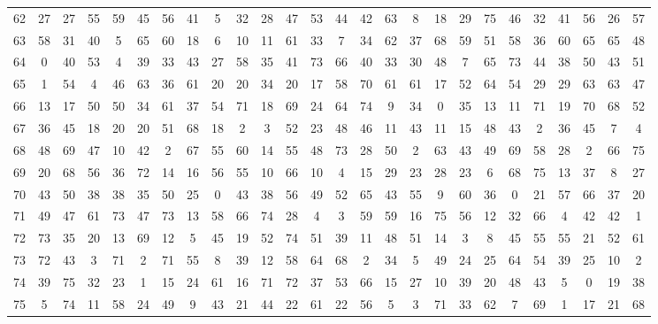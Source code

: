 \begin{table}
\begin{tabular}{c c c c c c c c c c c c c c c c c c c c c c c c c c }
62 & 27 & 27 & 55 & 59 & 45 & 56 & 41 & 5 & 32 & 28 & 47 & 53 & 44 & 42 & 63 & 8 & 18 & 29 & 75 & 46 & 32 & 41 & 56 & 26 & 57 \\
63 & 58 & 31 & 40 & 5 & 65 & 60 & 18 & 6 & 10 & 11 & 61 & 33 & 7 & 34 & 62 & 37 & 68 & 59 & 51 & 58 & 36 & 60 & 65 & 65 & 48 \\
64 & 0 & 40 & 53 & 4 & 39 & 33 & 43 & 27 & 58 & 35 & 41 & 73 & 66 & 40 & 33 & 30 & 48 & 7 & 65 & 73 & 44 & 38 & 50 & 43 & 51 \\
65 & 1 & 54 & 4 & 46 & 63 & 36 & 61 & 20 & 20 & 34 & 20 & 17 & 58 & 70 & 61 & 61 & 17 & 52 & 64 & 54 & 29 & 29 & 63 & 63 & 47 \\
66 & 13 & 17 & 50 & 50 & 34 & 61 & 37 & 54 & 71 & 18 & 69 & 24 & 64 & 74 & 9 & 34 & 0 & 35 & 13 & 11 & 71 & 19 & 70 & 68 & 52 \\
67 & 36 & 45 & 18 & 20 & 20 & 51 & 68 & 18 & 2 & 3 & 52 & 23 & 48 & 46 & 11 & 43 & 11 & 15 & 48 & 43 & 2 & 36 & 45 & 7 & 4 \\
68 & 48 & 69 & 47 & 10 & 42 & 2 & 67 & 55 & 60 & 14 & 55 & 48 & 73 & 28 & 50 & 2 & 63 & 43 & 49 & 69 & 58 & 28 & 2 & 66 & 75 \\
69 & 20 & 68 & 56 & 36 & 72 & 14 & 16 & 56 & 55 & 10 & 66 & 10 & 4 & 15 & 29 & 23 & 28 & 23 & 6 & 68 & 75 & 13 & 37 & 8 & 27 \\
70 & 43 & 50 & 38 & 38 & 35 & 50 & 25 & 0 & 43 & 38 & 56 & 49 & 52 & 65 & 43 & 55 & 9 & 60 & 36 & 0 & 21 & 57 & 66 & 37 & 20 \\
71 & 49 & 47 & 61 & 73 & 47 & 73 & 13 & 58 & 66 & 74 & 28 & 4 & 3 & 59 & 59 & 16 & 75 & 56 & 12 & 32 & 66 & 4 & 42 & 42 & 1 \\
72 & 73 & 35 & 20 & 13 & 69 & 12 & 5 & 45 & 19 & 52 & 74 & 51 & 39 & 11 & 48 & 51 & 14 & 3 & 8 & 45 & 55 & 55 & 21 & 52 & 61 \\
73 & 72 & 43 & 3 & 71 & 2 & 71 & 55 & 8 & 39 & 12 & 58 & 64 & 68 & 2 & 34 & 5 & 49 & 24 & 25 & 64 & 54 & 39 & 25 & 10 & 2 \\
74 & 39 & 75 & 32 & 23 & 1 & 15 & 24 & 61 & 16 & 71 & 72 & 37 & 53 & 66 & 15 & 27 & 10 & 39 & 20 & 48 & 43 & 5 & 0 & 19 & 38 \\
75 & 5 & 74 & 11 & 58 & 24 & 49 & 9 & 43 & 21 & 44 & 22 & 61 & 22 & 56 & 5 & 3 & 71 & 33 & 62 & 7 & 69 & 1 & 17 & 21 & 68 \\
\hline
\end{tabular}
\end{table}